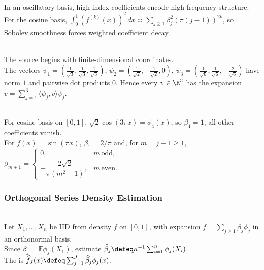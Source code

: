 \begin{principle} \label{princ:smoothness-means-small-high-frequency-coefficients} \\
In an oscillatory basis, high-index coefficients encode high-frequency structure.\\
For the cosine basis, $\int_0^1(f^{(k)}(x))^2\,dx\asymp\sum_{j\geq1}\beta_j^2(\pi(j-1))^{2k}$, so Sobolev smoothness forces weighted coefficient decay.
\end{principle}

\begin{example} \label{ex:source-orthonormal-vector-basis} \\
The source begins with finite-dimensional coordinates.\\
The vectors $\psi_1=\left(\frac1{\sqrt3},\frac1{\sqrt3},\frac1{\sqrt3}\right)$, $\psi_2=\left(\frac1{\sqrt2},-\frac1{\sqrt2},0\right)$, $\psi_3=\left(\frac1{\sqrt6},\frac1{\sqrt6},-\frac2{\sqrt6}\right)$ have norm $1$ and pairwise dot products $0$. Hence every $v\in\R^3$ has the expansion $v=\sum_{j=1}^{3}\langle \psi_j,v\rangle\psi_j$.
\end{example}

\begin{example} \label{ex:cosine-basis-source-exercise-coefficients} \\
For cosine basis on $[0,1]$, $\sqrt2\cos(3\pi x)=\phi_4(x)$, so $\beta_4=1$, all other coefficients vanish.\\
For $f(x)=\sin(\pi x)$, $\beta_1=2/\pi$ and, for $m=j-1\geq1$, $\beta_{m+1}=
\begin{cases}
0, & m\ \text{odd},\\[2mm]
-\dfrac{2\sqrt2}{\pi(m^2-1)}, & m\ \text{even}.
\end{cases}$.
\end{example}

\subsubsection{Orthogonal Series Density Estimation}

\begin{definition} \label{def:orthogonal-series-density-estimator} \\
Let $X_1,\ldots,X_n$ be IID from density $f$ on $[0,1]$, with expansion $f=\sum_{j\geq1}\beta_j\phi_j$ in an orthonormal basis.\\
Since $\beta_j=\mathbb{E}\phi_j(X_1)$, estimate $\widehat\beta_j\defeq n^{-1}\sum_{i=1}^{n}\phi_j(X_i)$.\\
The  is $\widehat f_J(x)\defeq\sum_{j=1}^{J}\widehat\beta_j\phi_j(x)$.
\end{definition}

